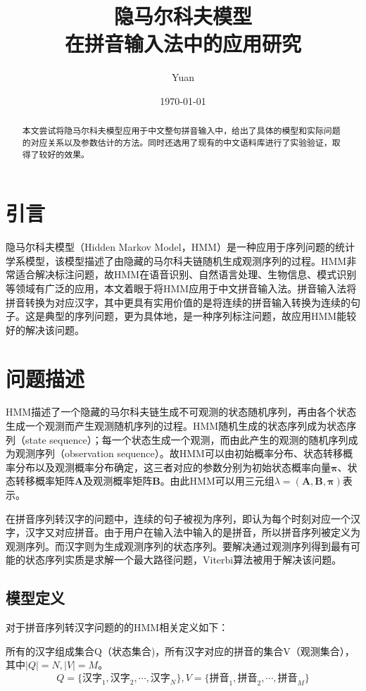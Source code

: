 \documentclass[12pt,a4paper,draft]{ctexart}
\title{隐马尔科夫模型 \\
	在拼音输入法中的应用研究}
\author{Yuan}
\date{\small\today}
\begin{document}
\maketitle
\begin{abstract}
本文尝试将隐马尔科夫模型应用于中文整句拼音输入中，给出了具体的模型和实际问题的对应关系以及参数估计的方法。同时还选用了现有的中文语料库进行了实验验证，取得了较好的效果。
\end{abstract}	
\section{引言}
隐马尔科夫模型（Hidden Markov Model，HMM）是一种应用于序列问题的统计学系模型，该模型描述了由隐藏的马尔科夫链随机生成观测序列的过程。HMM非常适合解决标注问题，故HMM在语音识别、自然语言处理、生物信息、模式识别等领域有广泛的应用，本文着眼于将HMM应用于中文拼音输入法。拼音输入法将拼音转换为对应汉字，其中更具有实用价值的是将连续的拼音输入转换为连续的句子。这是典型的序列问题，更为具体地，是一种序列标注问题，故应用HMM能较好的解决该问题。
\section{问题描述}
HMM描述了一个隐藏的马尔科夫链生成不可观测的状态随机序列，再由各个状态生成一个观测而产生观测随机序列的过程。HMM随机生成的状态序列成为状态序列（state sequence）；每一个状态生成一个观测，而由此产生的观测的随机序列成为观测序列（observation sequence）。故HMM可以由初始概率分布、状态转移概率分布以及观测概率分布确定，这三者对应的参数分别为初始状态概率向量$ \bm{\pi} $、状态转移概率矩阵$\bm{A}$及观测概率矩阵$\bm{B}$。由此HMM可以用三元组$ \lambda=(\bm{A},\bm{B},\bm{\pi}) $表示\cite{李航统计学习}。

在拼音序列转汉字的问题中，连续的句子被视为序列，即认为每个时刻对应一个汉字，汉字又对应拼音。由于用户在输入法中输入的是拼音，所以拼音序列被定义为观测序列。而汉字则为生成观测序列的状态序列。要解决通过观测序列得到最有可能的状态序列实质是求解一个最大路径问题，Viterbi算法\cite{viterbi2006a}被用于解决该问题。
\subsection{模型定义}
对于拼音序列转汉字问题的的HMM相关定义如下：


所有的汉字组成集合Q（状态集合)，所有汉字对应的拼音的集合V（观测集合），其中$ |Q|=N, |V|=M $。
\[ Q=\{ \mbox{汉字}_1,\mbox{汉字}_2,\cdots,\mbox{汉字}_N \},V=\{ \mbox{拼音}_1,\mbox{拼音}_2,\cdots,\mbox{拼音}_M \}  \]
\end{document}
